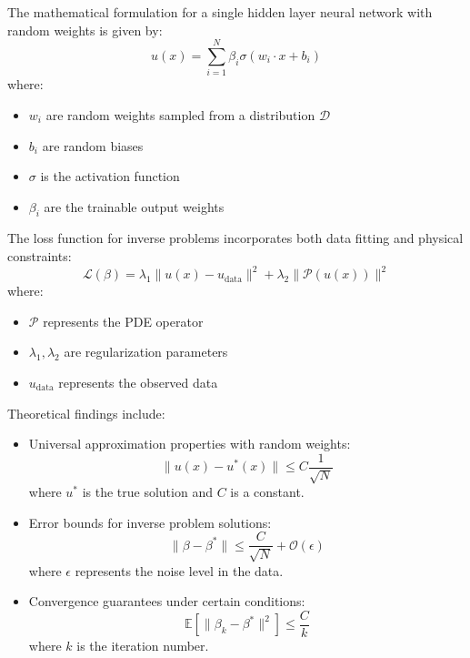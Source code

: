 \documentclass[12pt]{article}
\begin{document}
The mathematical formulation for a single hidden layer neural network with random weights is given by:
\begin{equation}
    u(x) = \sum_{i=1}^{N} \beta_i \sigma(w_i \cdot x + b_i)
\end{equation}
where:
\begin{itemize}
    \item $w_i$ are random weights sampled from a distribution $\mathcal{D}$
    \item $b_i$ are random biases
    \item $\sigma$ is the activation function
    \item $\beta_i$ are the trainable output weights
\end{itemize}

The loss function for inverse problems incorporates both data fitting and physical constraints:
\begin{equation}
    \mathcal{L}(\beta) = \lambda_1 \|u(x) - u_{\text{data}}\|^2 + \lambda_2 \|\mathcal{P}(u(x))\|^2
\end{equation}
where:
\begin{itemize}
    \item $\mathcal{P}$ represents the PDE operator
    \item $\lambda_1, \lambda_2$ are regularization parameters
    \item $u_{\text{data}}$ represents the observed data
\end{itemize}

Theoretical findings include:
\begin{itemize}
    \item Universal approximation properties with random weights:
    \begin{equation}
        \|u(x) - u^*(x)\| \leq C \frac{1}{\sqrt{N}}
    \end{equation}
    where $u^*$ is the true solution and $C$ is a constant.
    \item Error bounds for inverse problem solutions:
    \begin{equation}
        \|\beta - \beta^*\| \leq \frac{C}{\sqrt{N}} + \mathcal{O}(\epsilon)
    \end{equation}
    where $\epsilon$ represents the noise level in the data.
    \item Convergence guarantees under certain conditions:
    \begin{equation}
        \mathbb{E}[\|\beta_k - \beta^*\|^2] \leq \frac{C}{k}
    \end{equation}
    where $k$ is the iteration number.
\end{itemize}
\end{document}

